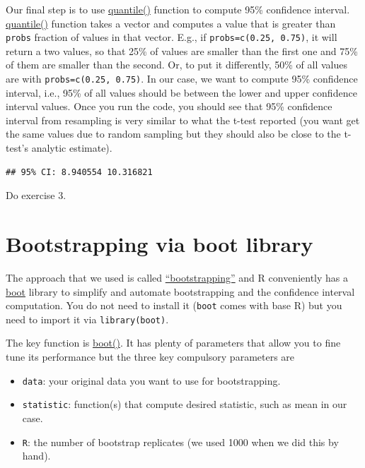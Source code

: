\documentclass[
]{book}
\providecommand{\tightlist}{%
  \setlength{\itemsep}{0pt}\setlength{\parskip}{0pt}}
\begin{document}
Our final step is to use \href{https://stat.ethz.ch/R-manual/R-devel/library/stats/html/quantile}{quantile()} function to compute 95\% confidence interval. \href{https://stat.ethz.ch/R-manual/R-devel/library/stats/html/quantile}{quantile()} function takes a vector and computes a value that is greater than \texttt{probs} fraction of values in that vector. E.g., if \texttt{probs=c(0.25,\ 0.75)}, it will return a two values, so that 25\% of values are smaller than the first one and 75\% of them are smaller than the second. Or, to put it differently, 50\% of all values are with \texttt{probs=c(0.25,\ 0.75)}. In our case, we want to compute 95\% confidence interval, i.e., 95\% of all values should be between the lower and upper confidence interval values. Once you run the code, you should see that 95\% confidence interval from resampling is very similar to what the t-test reported (you want get the same values due to random sampling but they should also be close to the t-test's analytic estimate).

\begin{verbatim}
## 95% CI: 8.940554 10.316821
\end{verbatim}

Do exercise 3.

\hypertarget{bootstrapping-via-boot-library}{%
\section{Bootstrapping via boot library}\label{bootstrapping-via-boot-library}}

The approach that we used is called \href{https://en.wikipedia.org/wiki/Bootstrapping_(statistics)}{``bootstrapping''} and R conveniently has a \href{https://cran.r-project.org/web/packages/boot/index.html}{boot} library to simplify and automate bootstrapping and the confidence interval computation. You do not need to install it (\texttt{boot} comes with base R) but you need to import it via \texttt{library(boot)}.

The key function is \href{https://stat.ethz.ch/R-manual/R-devel/library/boot/html/boot.html}{boot()}. It has plenty of parameters that allow you to fine tune its performance but the three key compulsory parameters are

\begin{itemize}
\tightlist
\item
  \texttt{data}: your original data you want to use for bootstrapping.
\item
  \texttt{statistic}: function(s) that compute desired statistic, such as mean in our case.
\item
  \texttt{R}: the number of bootstrap replicates (we used 1000 when we did this by hand).
\end{itemize}
\end{document}
